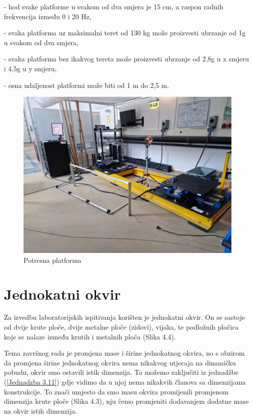 \documentclass[12pt]{book}
\begin{document}
- hod svake platforme u svakom od dva smjera je 15 cm, a raspon radnih frekvencija između 0 i 20 Hz,

- svaka platforma uz maksimalni teret od 130 kg može proizvesti ubrzanje od 1g u svakom od dva smjera,

- svaka platforma bez ikakvog tereta može proizvesti ubrzanje od 2,8g u x smjeru i 4,5g u y smjeru,

- osna udaljenost platformi može biti od 1 m do 2,5 m. \cite{oprema}

\begin{figure}[H]
	\centering
	\includegraphics[width=0.7\linewidth]{Slike/potresni}
	\caption{Potresna platforma}
	\label{fig:potresni}
\end{figure}

\newpage

\section{Jednokatni okvir}

Za izvedbu laboratorijskih ispitivanja korišten je jednokatni okvir. On se sastoje od dvije krute ploče, dvije metalne ploče (zidovi), vijaka, te podložnih pločica koje se nalaze između krutih i metalnih ploča (Slika 4.4). 

Tema završnog rada je promjena mase i širine jednokatnog okvira, no s obzirom da promjena širine jednokatnog okvira nema nikakvog utjecaja na dinamičku pobudu, okvir smo ostavili istih dimenzija. To možemo zaključiti iz jednadžbe (\ref{Jednadzba 3.11}) gdje vidimo da u njoj nema nikakvih članova sa dimenzijama konstrukcije. To znači umjesto da smo masu okvira promijenili promjenom dimenzija krute ploče (Slika 4.3), nju čemo promjeniti dodavanjem dodatne mase na okvir istih dimenzija. 
\end{document}
